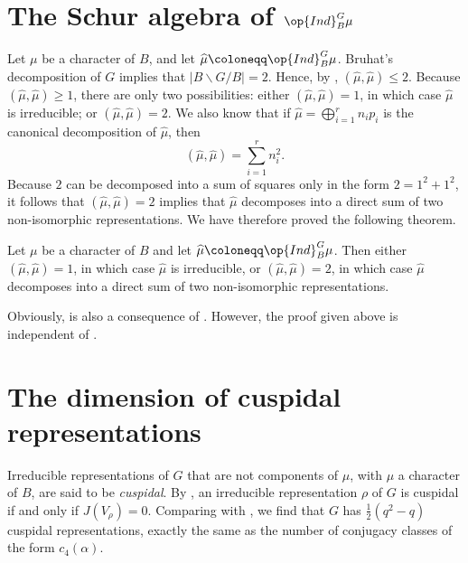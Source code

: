 \documentclass[../main.tex]{subfiles}
\begin{document}
\section{The Schur algebra of \texorpdfstring{$\op{Ind}^G_B\mu$}{ Ind mu}}
Let $\mu$ be a character of $B$, and let $\widehat\mu\coloneqq\op{Ind}^G_B\mu$. Bruhat's decomposition of $G$ implies that $\left|B\backslash G/B\right|=2$. Hence, by , $\left(\widehat\mu,\widehat\mu\right)\le2$. Because $\left(\widehat\mu,\widehat\mu\right)\ge1$, there are only two possibilities: either $\left(\widehat\mu,\widehat\mu\right)=1$, in which case $\widehat\mu$ is irreducible; or $\left(\widehat\mu,\widehat\mu\right)=2$. We also know that if $\widehat\mu=\bigoplus_{i=1}^rn_ip_i$ is the canonical decomposition of $\widehat\mu$, then
\[\left(\widehat\mu,\widehat\mu\right)=\sum_{i=1}^rn_i^2.\]
Because $2$ can be decomposed into a sum of squares only in the form $2=1^2+1^2$, it follows that $\left(\widehat\mu,\widehat\mu\right)=2$ implies that $\widehat\mu$ decomposes into a direct sum of two non-isomorphic representations. We have therefore proved the following theorem.
\begin{theorem} \label{thm:mu-hat-decomposition}
	Let $\mu$ be a character of $B$ and let $\widehat\mu\coloneqq\op{Ind}^G_B\mu$. Then either $\left(\widehat\mu,\widehat\mu\right)=1$, in which case $\widehat\mu$ is irreducible, or $\left(\widehat\mu,\widehat\mu\right)=2$, in which case $\widehat\mu$ decomposes into a direct sum of two non-isomorphic representations.
\end{theorem}
Obviously,  is also a consequence of . However, the proof given above is independent of .

\section{The dimension of cuspidal representations}
Irreducible representations of $G$ that are not components of $\widehat\mu$, with $\mu$ a character of $B$, are said to be \textit{cuspidal}. By , an irreducible representation $\rho$ of $G$ is cuspidal if and only if $J(V_\rho)=0$. Comparing  with , we find that $G$ has $\frac12\left(q^2-q\right)$ cuspidal representations, exactly the same as the number of conjugacy classes of the form $c_4(\alpha)$.
\end{document}
